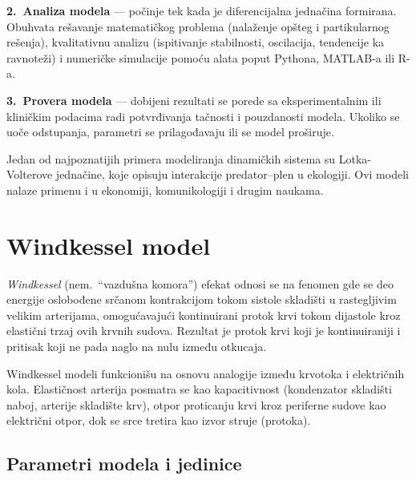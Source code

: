 \documentclass[12pt,a4paper]{article}
\begin{document}
\textbf{2.\ Analiza modela} --- počinje tek kada je diferencijalna jednačina formirana. Obuhvata rešavanje matematičkog problema (nalaženje opšteg i partikularnog rešenja), kvalitativnu analizu (ispitivanje stabilnosti, oscilacija, tendencije ka ravnoteži) i numeričke simulacije pomoću alata poput Pythona, MATLAB-a ili R-a.

\textbf{3.\ Provera modela} --- dobijeni rezultati se porede sa eksperimentalnim ili kliničkim podacima radi potvrđivanja tačnosti i pouzdanosti modela. Ukoliko se uoče odstupanja, parametri se prilagođavaju ili se model proširuje.

Jedan od najpoznatijih primera modeliranja dinamičkih sistema su Lotka-Volterove jednačine, koje opisuju interakcije predator--plen u ekologiji. Ovi modeli nalaze primenu i u ekonomiji, komunikologiji i drugim naukama.


\section{Windkessel model}

\textit{Windkessel} (nem.\ ``vazdušna komora'') efekat odnosi se na fenomen gde se deo energije oslobođene srčanom kontrakcijom tokom sistole skladišti u rastegljivim velikim arterijama, omogućavajući kontinuirani protok krvi tokom dijastole kroz elastični trzaj ovih krvnih sudova. Rezultat je protok krvi koji je kontinuiraniji i pritisak koji ne pada naglo na nulu između otkucaja.


Windkessel modeli funkcionišu na osnovu analogije između krvotoka i električnih kola. Elastičnost arterija posmatra se kao kapacitivnost (kondenzator skladišti naboj, arterije skladište krv), otpor proticanju krvi kroz periferne sudove kao električni otpor, dok se srce tretira kao izvor struje (protoka).

\subsection{Parametri modela i jedinice}
\end{document}

